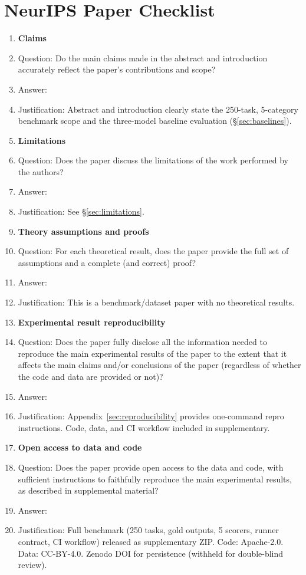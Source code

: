 \section*{NeurIPS Paper Checklist}

\begin{enumerate}

\item {\bf Claims}
    \item[] Question: Do the main claims made in the abstract and introduction accurately reflect the paper's contributions and scope?
    \item[] Answer: \answerYes{}
    \item[] Justification: Abstract and introduction clearly state the 250-task, 5-category benchmark scope and the three-model baseline evaluation (\S\ref{sec:baselines}).

\item {\bf Limitations}
    \item[] Question: Does the paper discuss the limitations of the work performed by the authors?
    \item[] Answer: \answerYes{}
    \item[] Justification: See \S\ref{sec:limitations}.

\item {\bf Theory assumptions and proofs}
    \item[] Question: For each theoretical result, does the paper provide the full set of assumptions and a complete (and correct) proof?
    \item[] Answer: \answerNA{}
    \item[] Justification: This is a benchmark/dataset paper with no theoretical results.

\item {\bf Experimental result reproducibility}
    \item[] Question: Does the paper fully disclose all the information needed to reproduce the main experimental results of the paper to the extent that it affects the main claims and/or conclusions of the paper (regardless of whether the code and data are provided or not)?
    \item[] Answer: \answerYes{}
    \item[] Justification: Appendix~\ref{sec:reproducibility} provides one-command repro instructions. Code, data, and CI workflow included in supplementary.

\item {\bf Open access to data and code}
    \item[] Question: Does the paper provide open access to the data and code, with sufficient instructions to faithfully reproduce the main experimental results, as described in supplemental material?
    \item[] Answer: \answerYes{}
    \item[] Justification: Full benchmark (250 tasks, gold outputs, 5 scorers, runner contract, CI workflow) released as supplementary ZIP. Code: Apache-2.0. Data: CC-BY-4.0. Zenodo DOI for persistence (withheld for double-blind review).


\end{enumerate}
